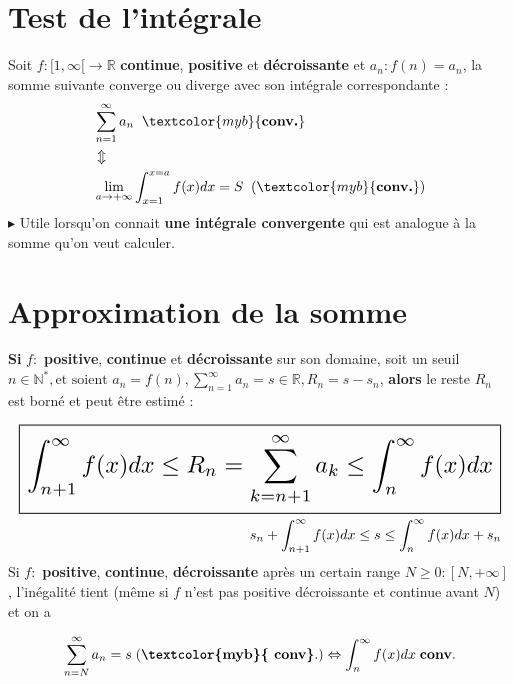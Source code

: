 \documentclass{report}
\begin{document}
\begin{multicols*}{3}
    \section{Test de l'intégrale}
        Soit $f : [1, \infty [ \rightarrow  \mathbb{R}$ 
        \textbf{continue}, \textbf{positive} et \textbf{décroissante} 
        et $a_n : f(n) = a_n$, la somme suivante converge ou diverge avec 
        son intégrale correspondante :
            \begin{align*}
                &\sum_{n=1}^{\infty }a_n \;\; \textcolor{myb}{\textbf{conv.}} 
                \\
                & \Updownarrow 
                \\
                &\lim\limits_{a \to +\infty }\int_{x=1}^{x = a}f(x)dx = S \;\; 
                (\textcolor{myb}{\textbf{conv.}})    
            \end{align*}
    $\blacktriangleright$ Utile lorsqu'on connait \textbf{une intégrale convergente} qui est 
    analogue à la somme qu'on veut calculer. 


    \section{Approximation de la somme}
        \textbf{Si} $f:$ \textbf{positive}, \textbf{continue} et \textbf{décroissante} 
        sur son domaine, soit un seuil $n \in \mathbb{N}^*, \text{et  soient }  
        a_n = f(n), \sum_{n=1}^{\infty }a_n = s \in \mathbb{R}, 
        R_n = s - s_n$, \textbf{alors} le reste $R_n$ est borné et peut être 
         estimé :

     \begin{align*}
        \resizebox{1\linewidth}{!}{$ 
            \boxed{
                \int_{n+1}^{\infty }f(x)dx \leq R_n 
                = 
                \sum_{k=n+1}^{\infty} a_k 
                \leq \int_{n}^{\infty }f(x)dx
            }
        $}
        \\ 
        s_n + \int_{n+1}^{\infty }f(x)dx \leq s  
        \leq \int_{n}^{\infty }f(x)dx + s_n
     \end{align*}
     Si $f:$ \textbf{positive}, \textbf{continue},  \textbf{décroissante} 
     après un certain range $N \geq 0 : [N, +\infty]$, l'inégalité tient 
     (même si $f$ n'est pas positive décroissante et continue avant $N$) 
     et on a 
    
     \begin{align*}
         \sum_{n=N}^{\infty} a_n = s \; 
         (\textbf{\textcolor{myb}{ conv}}.) 
         \Leftrightarrow    
         \int_{n}^{\infty }f(x)dx  \; \textbf{conv}.   
     \end{align*}               



\end{multicols*}
\end{document}

